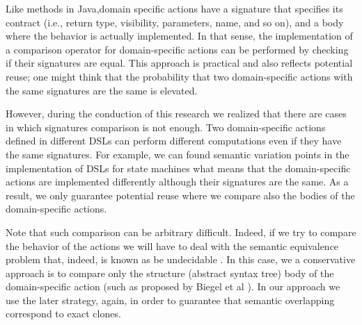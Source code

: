 Like methods in Java,domain specific actions have a signature that specifies its contract (i.e., return type, visibility, parameters, name, and so on), and a body where the behavior is actually implemented. In that sense, the implementation of a comparison operator for domain-specific actions can be performed by checking if their signatures are equal. This approach is practical and also reflects potential reuse; one might think that the probability that two domain-specific actions with the same signatures are the same is elevated.

However, during the conduction of this research we realized that there are cases in which signatures comparison is not enough. Two domain-specific actions defined in different DSLs can perform different computations even if they have the same signatures. For example, we can found semantic variation points in the implementation of DSLs for state machines what means that the domain-specific actions are implemented differently although their signatures are the same. As a result, we only guarantee potential reuse where we compare also the bodies of the domain-specific actions. 

Note that such comparison can be arbitrary difficult. Indeed, if we try to compare  the behavior of the actions we will have to deal with the semantic equivalence problem that, indeed, is known as be undecidable \cite{Lucanu:2013}. In this case, we a conservative approach is to compare only the structure (abstract syntax tree) body of the domain-specific action (such as proposed by Biegel et al \cite{Biegel:2010}). In our approach we use the later strategy, again, in order to guarantee that semantic overlapping correspond to exact clones.


